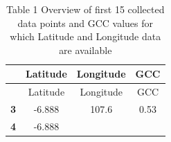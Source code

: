 \documentclass[]{elsarticle} %
\begin{document}
\begin{longtable}[]{@{}cccc@{}}
\caption{Table 1 Overview of first 15 collected data points and GCC
values for which Latitude and Longitude data are
available}\tabularnewline
\toprule
\begin{minipage}[b]{0.11\columnwidth}\centering\strut
~\strut
\end{minipage} & \begin{minipage}[b]{0.14\columnwidth}\centering\strut
Latitude\strut
\end{minipage} & \begin{minipage}[b]{0.15\columnwidth}\centering\strut
Longitude\strut
\end{minipage} & \begin{minipage}[b]{0.07\columnwidth}\centering\strut
GCC\strut
\end{minipage}\tabularnewline
\midrule
\endfirsthead
\toprule
\begin{minipage}[b]{0.11\columnwidth}\centering\strut
~\strut
\end{minipage} & \begin{minipage}[b]{0.14\columnwidth}\centering\strut
Latitude\strut
\end{minipage} & \begin{minipage}[b]{0.15\columnwidth}\centering\strut
Longitude\strut
\end{minipage} & \begin{minipage}[b]{0.07\columnwidth}\centering\strut
GCC\strut
\end{minipage}\tabularnewline
\midrule
\endhead
\begin{minipage}[t]{0.11\columnwidth}\centering\strut
\textbf{3}\strut
\end{minipage} & \begin{minipage}[t]{0.14\columnwidth}\centering\strut
-6.888\strut
\end{minipage} & \begin{minipage}[t]{0.15\columnwidth}\centering\strut
107.6\strut
\end{minipage} & \begin{minipage}[t]{0.07\columnwidth}\centering\strut
0.53\strut
\end{minipage}\tabularnewline
\begin{minipage}[t]{0.11\columnwidth}\centering\strut
\textbf{4}\strut
\end{minipage} & \begin{minipage}[t]{0.14\columnwidth}\centering\strut
-6.888\strut
\end{minipage} & \begin{minipage}[t]{0.15\columnwidth}\centering\strut

\end{minipage}
\end{longtable}
\end{document}
